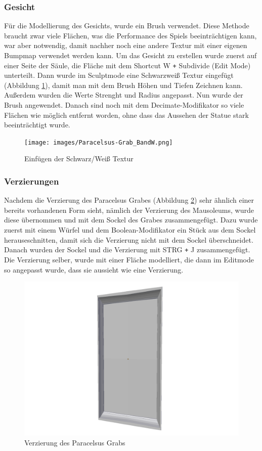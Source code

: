 \subsubsection{Gesicht}
Für die Modellierung des Gesichts, wurde ein Brush verwendet. Diese Methode braucht zwar viele Flächen, was die Performance des Spiels beeinträchtigen kann, war
aber notwendig, damit nachher noch eine andere Textur mit einer eigenen Bumpmap verwendet werden kann. Um das Gesicht zu erstellen wurde zuerst auf einer Seite der Säule,
die Fläche mit dem Shortcut W \verb-+- Subdivide (Edit Mode) unterteilt. Dann wurde im Sculptmode eine Schwarzweiß Textur eingefügt (Abbildung \ref{Paracelsus_Grab:image4}),
damit man mit dem Brush Höhen und Tiefen Zeichnen kann. Außerdem wurden die Werte Strenght und Radius angepasst. Nun wurde der Brush angewendet. Danach sind noch mit dem
Decimate-Modifikator so viele Flächen wie möglich entfernt worden, ohne dass das Aussehen der Statue stark beeinträchtigt wurde.

\begin{figure}[h]
    \centering
    \texttt{[image: images/Paracelsus-Grab\_BandW.png]}
    \caption{Einfügen der Schwarz/Weiß Textur}
    \label{Paracelsus_Grab:image4}
\end{figure}

\subsubsection{Verzierungen}
Nachdem die Verzierung des Paracelsus Grabes (Abbildung \ref{Paracelsus_Grab:image3}) sehr ähnlich einer bereits vorhandenen Form sieht, nämlich der Verzierung des Mausoleums, wurde diese übernommen und
mit dem Sockel des Grabes zusammengefügt. Dazu wurde zuerst mit einem Würfel und dem Boolean-Modifikator ein Stück aus dem Sockel herauseschnitten, damit
sich die Verzierung nicht mit dem Sockel überschneidet. Danach wurden der Sockel und die Verzierung mit STRG \verb-+- J zusammengefügt. Die Verzierung selber, wurde mit einer
Fläche modelliert, die dann im Editmode so angepasst wurde, dass sie aussieht wie eine Verzierung.
\begin{figure}[h]
    \centering
    \includegraphics[width=.8\textwidth]{images/Paracelsus-Grab_Verzierung.png}
    \caption{Verzierung des Paracelsus Grabs}
    \label{Paracelsus_Grab:image3}
\end{figure}


